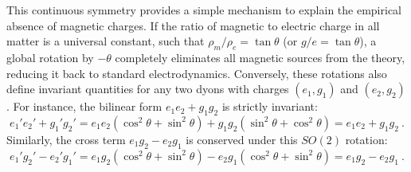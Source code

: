\documentclass[a4paper,11pt]{article}
\begin{document}
This continuous symmetry provides a simple mechanism to explain the empirical absence of magnetic charges. If the ratio of magnetic to electric charge in all matter is a universal constant, such that $\rho_m / \rho_e = \tan\theta$ (or $g/e = \tan\theta$), a global rotation by $-\theta$ completely eliminates all magnetic sources from the theory, reducing it back to standard electrodynamics. Conversely, these rotations also define invariant quantities for any two dyons with charges $(e_1, g_1)$ and $(e_2, g_2)$. For instance, the bilinear form $e_1 e_2 + g_1 g_2$ is strictly invariant:
\begin{equation}
    e_1' e_2' + g_1' g_2' = e_1 e_2 (\cos^2\theta + \sin^2\theta) + g_1 g_2 (\sin^2\theta + \cos^2\theta) = e_1 e_2 + g_1 g_2\ .
\end{equation}
Similarly, the cross term $e_1 g_2 - e_2 g_1$ is conserved under this $SO(2)$ rotation:
\begin{equation}
    e_1' g_2' - e_2' g_1' = e_1 g_2 (\cos^2\theta + \sin^2\theta) - e_2 g_1 (\cos^2\theta + \sin^2\theta) = e_1 g_2 - e_2 g_1\ .
\end{equation}
\end{document}
